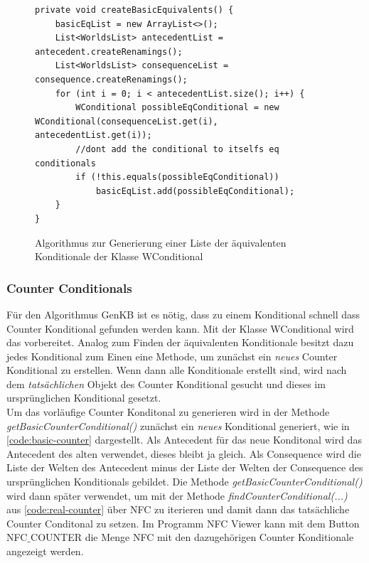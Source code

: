 \documentclass[12pt,a4paper]{article}
\begin{document}
\begin{figure}
\begin{lstlisting}
private void createBasicEquivalents() {
    basicEqList = new ArrayList<>();
    List<WorldsList> antecedentList = antecedent.createRenamings();
    List<WorldsList> consequenceList = consequence.createRenamings();
    for (int i = 0; i < antecedentList.size(); i++) {
        WConditional possibleEqConditional = new WConditional(consequenceList.get(i), antecedentList.get(i));
        //dont add the conditional to itselfs eq conditionals
        if (!this.equals(possibleEqConditional))
            basicEqList.add(possibleEqConditional);
    }
}
\end{lstlisting}
\caption{Algorithmus zur Generierung einer Liste der äquivalenten Konditionale der Klasse WConditional}
\label{code:create-equivalents}
\end{figure} 




\subsubsection{Counter Conditionals}
\label{sec:counter-conditonals}
Für den Algorithmus GenKB ist es nötig, dass zu einem Konditional schnell dass Counter Konditional gefunden werden kann. Mit der Klasse WConditional wird das vorbereitet. Analog zum Finden der äquivalenten Konditionale besitzt dazu jedes Konditional zum Einen eine Methode, um zunächst ein \textit{neues} Counter Konditional zu erstellen. Wenn dann alle Konditionale erstellt sind, wird nach dem \textit{tatsächlichen} Objekt des Counter Konditional gesucht und dieses im ursprünglichen Konditional gesetzt. \\
Um das vorläufige Counter Konditonal zu generieren wird in der Methode \textit{getBasicCounterConditional()} zunächst ein \textit{neues} Konditional generiert, wie in \autoref{code:basic-counter} dargestellt. Als Antecedent für das neue Konditonal wird das Antecedent des alten verwendet, dieses bleibt ja gleich. Als Consequence wird die Liste der Welten des Antecedent minus der Liste der Welten der Consequence  des ursprünglichen Konditionals gebildet. Die Methode \textit{getBasicCounterConditional()} wird dann später verwendet, um mit der Methode \textit{findCounterConditional(...)} aus \autoref{code:real-counter} über NFC zu iterieren und damit dann das tatsächliche Counter Conditonal zu setzen. Im Programm NFC Viewer kann mit dem Button NFC$\_$COUNTER die Menge NFC mit den dazugehörigen Counter Konditionale angezeigt werden.
\end{document}
